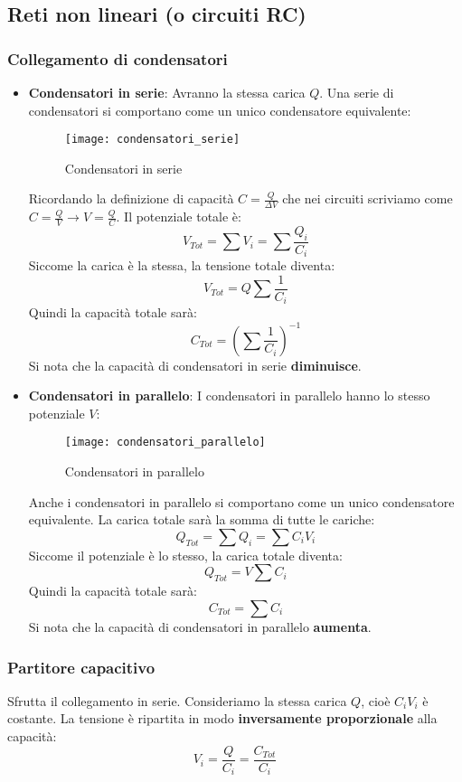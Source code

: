 \documentclass[a4paper]{article}
\begin{document}
\subsection{Reti non lineari (o circuiti RC)}
\subsubsection{Collegamento di condensatori}
\begin{itemize}
  \item \textbf{Condensatori in serie}: Avranno la stessa carica \( Q \).
    Una serie di condensatori si comportano come un unico condensatore equivalente:
    \begin{figure}[H]
      \centering
      \texttt{[image: condensatori\_serie]}
      \caption{Condensatori in serie}
    \end{figure}
    \noindent
    Ricordando la definizione di capacità \( C = \frac{Q}{\Delta V} \) che nei circuiti
    scriviamo come \( C = \frac{Q}{V} \to V = \frac{Q}{C} \). Il potenziale totale è:
    \[
      V_{Tot} = \sum V_i =  \sum \frac{Q_i}{C_i}
    \] 
    Siccome la carica è la stessa, la tensione totale diventa:
    \[
      V_{Tot} = Q \sum \frac{1}{C_i}
    \] 
    Quindi la capacità totale sarà:
    \[
      C_{Tot} = \left( \sum \frac{1}{C_i} \right)^{-1}
    \] 
    Si nota che la capacità di condensatori in serie \textbf{diminuisce}.

  \item \textbf{Condensatori in parallelo}: I condensatori in parallelo hanno lo stesso
    potenziale \( V \):
    \begin{figure}[H]
      \centering
      \texttt{[image: condensatori\_parallelo]}
      \caption{Condensatori in parallelo}
    \end{figure}
    \noindent
    Anche i condensatori in parallelo si comportano come un unico condensatore equivalente.
    La carica totale sarà la somma di tutte le cariche:
    \[
      Q_{Tot} = \sum Q_i = \sum C_i V_i
    \] 
    Siccome il potenziale è lo stesso, la carica totale diventa:
    \[
      Q_{Tot} = V \sum C_i
    \]
    Quindi la capacità totale sarà:
    \[
      C_{Tot} = \sum C_i
    \]
    Si nota che la capacità di condensatori in parallelo \textbf{aumenta}.
\end{itemize}

\subsubsection{Partitore capacitivo}
Sfrutta il collegamento in serie. Consideriamo
la stessa carica \( Q \), cioè \( C_i V_i \) è costante. La tensione è ripartita in modo
\textbf{inversamente proporzionale} alla capacità:
\[
  V_i = \frac{Q}{C_i} = \frac{C_{Tot}}{C_i}
\] 
\end{document}
